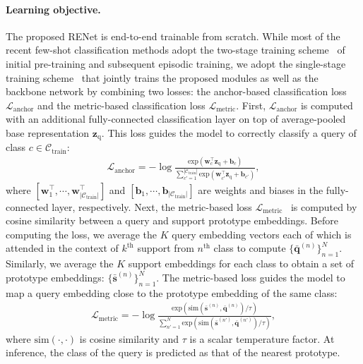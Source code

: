 \documentclass[10pt,twocolumn,letterpaper]{article}
\newcommand{\bs}{\mathbf{s}}
\newcommand{\bq}{\mathbf{q}}
\newcommand{\bw}{\mathbf{w}}
\newcommand{\bz}{\mathbf{z}}
\newcommand{\bb}{\mathbf{b}}
\newcommand{\textq}{{\text{q}}}
\newcommand{\ours}{RENet\xspace}
\begin{document}
\paragraph{Learning objective.}
\label{sec:learning_objective}
The proposed \ours is end-to-end trainable from scratch.
While most of the recent few-shot classification methods adopt the two-stage training scheme~\cite{leo, frn, feat, deepemd} of initial pre-training and subsequent episodic training, we adopt the single-stage training scheme~\cite{can, tadam} that jointly trains the proposed modules as well as the backbone network by combining two losses: the anchor-based classification loss $\mathcal{L}_{\text{anchor}}$ and the metric-based classification loss $\mathcal{L}_{\text{metric}}$.
First, $\mathcal{L}_{\text{anchor}}$ is computed with an additional fully-connected classification layer on top of average-pooled base representation $\bz_\textq$.
This loss guides the model to correctly classify a query of class $c \in \mathcal{C}_{\text{train}}$: 
\begin{eqnarray}
    \mathcal{L}_{\text{anchor}} = -\log \frac{\mathrm{exp}(\bw_{c}^{\top}\bz_\textq + \bb_{c})}{\sum_{c'=1}^{|\mathcal{C}_{\text{train}}|} \mathrm{exp}(\bw_{c'}^{\top}\bz_\textq + \bb_{c'})},
\label{eq:fc_classification_probability}
\end{eqnarray}
where $[\bw_{1}^{\top}, \cdots, \bw_{|\mathcal{C}_{\text{train}}|}^{\top}]$ and $[\bb_{1}, \cdots, \bb_{|\mathcal{C}_{\text{train}}|}]$ are weights and biases in the fully-connected layer, respectively.
Next, the metric-based loss $\mathcal{L}_{\text{metric}}$~\cite{matchingnet, protonet} is computed by cosine similarity between a query and support prototype embeddings.
Before computing the loss, we average the $K$ query embedding vectors each of which is attended in the context of $k^{\text{th}}$ support from $n^{\text{th}}$ class to compute $\{\bar{\bq}^{(n)}\}_{n=1}^{N}$.
Similarly, we average the $K$ support embeddings for each class to obtain a set of prototype embeddings: $\{\bar{\bs}^{(n)}\}_{n=1}^{N}$.
The metric-based loss guides the model to map a query embedding close to the prototype embedding of the same class:
\begin{eqnarray}
    \mathcal{L}_{\text{metric}} =-\log \frac{\mathrm{exp}(\mathrm{sim}(\mathbf{\bar{\bs}}^{(n)}, \mathbf{\bar{\bq}}^{(n)})/\tau)}{\sum_{n'=1}^{N}\mathrm{exp}(\mathrm{sim}(\mathbf{\bar{\bs}}^{(n')}, \mathbf{\bar{\bq}}^{(n')})/\tau)},
\label{eq:classification_probability}
\end{eqnarray}
where $\mathrm{sim}(\cdot, \cdot)$ is cosine similarity and $\tau$ is a scalar temperature factor.
At inference, the class of the query is predicted as that of the nearest prototype.
\end{document}
